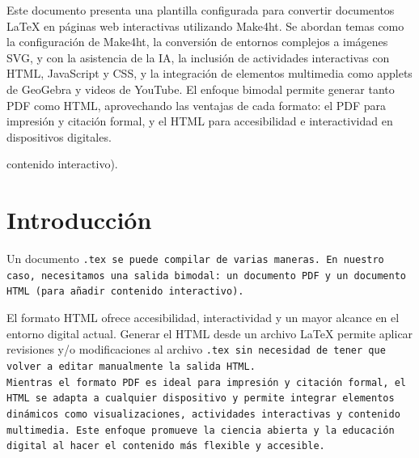 \documentclass[fleqn,oneside]{article}
\title{\fhvb{16}{Crear una  Web Interactica con LaTeX (usando Make4ht e IA)}}
\author{\fvnp{Walter Mora Flores}\\ \fvn{make4ht, html y ccs}}
\date{} %
\begin{document}
\def\contentsname{Contenido}
\def\refname{Bibliografía}    %
\def\bibname{Bibliografía}    %
\def\tablename{Tabla}
\def\figurename{Figura}
\thispagestyle{plain} %
\parindent=0mm

\maketitle
\solopdf{\tableofcontents} %




\begin{resumen}
Este documento presenta una  plantilla  configurada para convertir documentos LaTeX en páginas web interactivas utilizando  Make4ht. Se abordan temas como la configuración de Make4ht, la conversión de entornos complejos a imágenes SVG, y con la asistencia de la IA, la inclusión de actividades interactivas con HTML, JavaScript y CSS, y la integración de elementos multimedia como applets de GeoGebra y videos de YouTube. El enfoque bimodal permite generar tanto PDF como HTML, aprovechando las ventajas de cada formato: el PDF para impresión y citación formal, y el HTML para accesibilidad e interactividad en dispositivos digitales.
\end{resumen}

 contenido interactivo). \\


\label{sec:introduccion}
\section{Introducción}
Un documento \tt{.tex} se puede compilar de varias maneras. En nuestro caso, necesitamos una salida bimodal: un documento PDF y un documento HTML (para añadir contenido interactivo).

El formato HTML ofrece accesibilidad, interactividad y un mayor alcance en el entorno digital actual. Generar el HTML desde un archivo LaTeX  permite aplicar revisiones y/o modificaciones al archivo \tt{.tex} sin necesidad de tener que volver a editar manualmente la salida HTML.\\

Mientras el formato PDF es ideal para impresión y citación formal, el HTML se adapta a cualquier dispositivo y permite integrar elementos dinámicos como visualizaciones, actividades interactivas y contenido multimedia. Este enfoque promueve la ciencia abierta y la educación digital al hacer el contenido más flexible y accesible.\\
\end{document}
